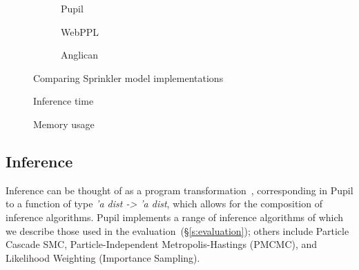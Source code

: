\documentclass[sigconf,timestamp]{acmart}
\newcommand{\s}[1]{(\S\ref{#1})}
\newcommand{\pupil}{Pupil\xspace}
\begin{document}
\begin{figure}
  \begin{subfigure}[t]{\linewidth}
    \caption{\label{lst:linreg:pupil}\pupil}
  \end{subfigure}
  \quad
  \begin{subfigure}[t]{\linewidth}
    \caption{\label{lst:linreg:webppl}WebPPL}
  \end{subfigure}
  \quad
  \begin{subfigure}[t]{\linewidth}
    \caption{\label{lst:linreg:anglican}Anglican}
  \end{subfigure}
  \caption{\label{lst:linreg}Comparing Sprinkler model implementations}
\end{figure}
\begin{figure*}
  \centering
  \begin{subfigure}[t]{\textwidth}
    \centering
    
    \caption{\label{fig:time-perf}
      Inference time}
  \end{subfigure}
  \begin{subfigure}[t]{\textwidth}
    \centering
    
    \caption{\label{fig:mem-perf}
      Memory usage}
  \end{subfigure}
  \caption{\pupil performance on different models, taking 10,000 samples from the posterior and averaging over 20 runs. Results shown for Metropolis-Hastings (\emph{mh}), Bootstrap Particle Filter (also known as Sequential Monte Carlo, \emph{smc}), and Rejection Sampling (\emph{rej}). Error bars show the 95\% confidence interval. }
\end{figure*}


\subsection{Inference}
Inference can be thought of as a program transformation~\cite{scibior2015practical, Zinkov2016ComposingIA}, corresponding in \pupil to a function of type \emph{'a dist -> 'a dist}, which allows for the composition of inference algorithms. \pupil implements a range of inference algorithms of which we describe those used in the evaluation~\s{s:evaluation}; others include Particle Cascade SMC, Particle-Independent Metropolis-Hastings (PMCMC), and Likelihood Weighting (Importance Sampling).
\end{document}
